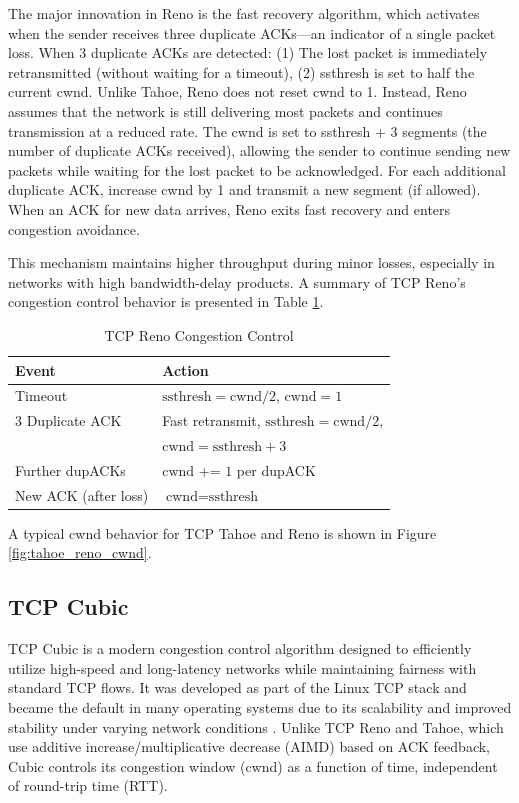 \documentclass[conference]{IEEEtran}
\begin{document}
The major innovation in Reno is the fast recovery algorithm, which activates when the sender receives three duplicate ACKs—an indicator of a single packet loss.
When 3 duplicate ACKs are detected: (1) The lost packet is immediately retransmitted (without waiting for a timeout), 
(2) ssthresh is set to half the current cwnd. 
Unlike Tahoe, Reno does not reset cwnd to 1. 
Instead, Reno assumes that the network is still delivering most packets and continues transmission at a reduced rate. 
The cwnd is set to ssthresh + 3 segments (the number of duplicate ACKs received), allowing the sender to continue sending new packets while waiting for the lost packet to be acknowledged.
For each additional duplicate ACK, increase cwnd by 1 and transmit a new segment (if allowed).
When an ACK for new data arrives, Reno exits fast recovery and enters congestion avoidance.

This mechanism maintains higher throughput during minor losses, especially in networks with high bandwidth-delay products.
A summary of TCP Reno's congestion control behavior is presented in Table \ref{tab:tcp_reno_desc}.

\begin{table}[!h]
    \centering
    \caption{TCP Reno Congestion Control}
    \begin{tabular}{@{}ll@{}}
        \toprule
        \textbf{Event} & \textbf{Action} \\ \midrule
        Timeout          & $\text{ssthresh} = \text{cwnd}/2$, $\text{cwnd}=1$  \\
        3 Duplicate ACK  &  Fast retransmit, $\text{ssthresh} = \text{cwnd}/2$, \\ 
                        & $\text{cwnd}= \text{ssthresh}+3$ \\
        Further dupACKs   & $\text{cwnd}$ += $1$ per dupACK  \\
        New ACK (after loss)  & $\text{cwnd} = \text{ssthresh}$  \\ \bottomrule
    \end{tabular}
    \label{tab:tcp_reno_desc}
\end{table}

\noindent A typical cwnd behavior for TCP Tahoe and Reno is shown in Figure \ref{fig:tahoe_reno_cwnd}.

\subsection{TCP Cubic}
TCP Cubic is a modern congestion control algorithm designed to efficiently utilize high-speed and long-latency networks while maintaining fairness with standard TCP flows. 
It was developed as part of the Linux TCP stack and became the default in many operating systems due to its scalability and improved stability under varying network conditions \cite{b3}. 
Unlike TCP Reno and Tahoe, which use additive increase/multiplicative decrease (AIMD) based on ACK feedback, Cubic controls its congestion window (cwnd) as a function of time, independent of round-trip time (RTT).
\end{document}

